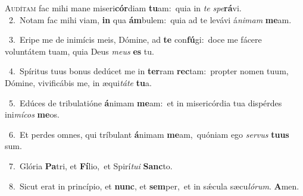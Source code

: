 \lettrine{\initial\textcolor{\initialcolor}{A}}{udítam} fac mihi mane miseri\-\textbf{cór}\-diam \textbf{tu}\-am:~\star quia in \textit{te} \textit{spe}\-\textbf{rá}vi.\\
{\numbfont\textcolor{\numbcolor}{~2.}}~Notam fac mihi viam, \textbf{in} qua \textbf{ám}\-bulem:~\star quia ad te levávi á\-\textit{ni}\-\textit{mam} \textbf{me}\-am.\par
{\numbfont\textcolor{\numbcolor}{~3.}}~Eripe me de inimícis meis, Dómine, ad \textbf{te} con\-\textbf{fú}\-gi:~\star doce me fácere voluntátem tuam, quia Deus \textit{me}\-\textit{us} \textbf{es} tu.\par
{\numbfont\textcolor{\numbcolor}{~4.}}~Spíritus tuus bonus dedúcet me in \textbf{ter}\-ram \textbf{rec}\-tam:~\star propter nomen tuum, Dómine, vivificábis me, in æqui\-\textit{tá}\-\textit{te} \textbf{tu}\-a.\par
{\numbfont\textcolor{\numbcolor}{~5.}}~Edúces de tribulatióne \textbf{á}\-nimam \textbf{me}\-am:~\star et in misericórdia tua dispérdes ini\-\textit{mí}\-\textit{cos} \textbf{me}\-os.\par
{\numbfont\textcolor{\numbcolor}{~6.}}~Et perdes omnes, qui tríbulant \textbf{á}\-nimam \textbf{me}\-am,~\star quóniam ego \textit{ser}\-\textit{vus} \textbf{tu}\-\textbf{us} sum.\par
{\numbfont\textcolor{\numbcolor}{~7.}}~Glória \textbf{Pa}\-tri, et \textbf{Fí}\-lio,~\star et Spirí\-\textit{tu}\-\textit{i} \textbf{Sanc}\-to.\par
{\numbfont\textcolor{\numbcolor}{~8.}}~Sicut erat in princípio, et \textbf{nunc}\-, et \textbf{sem}\-per,~\star et in sǽcula sæcu\-\textit{ló}\-\textit{rum}. \textbf{A}\-men.\par
